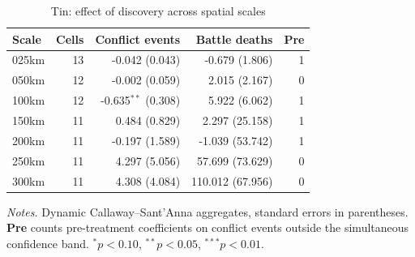 \begin{table}[H]
\centering
\footnotesize
\caption{Tin: effect of discovery across spatial scales}
\label{tab:tin_robustness}
\begin{tabular}{lrrrr}
\toprule
\textbf{Scale} & \textbf{Cells} & \textbf{Conflict events} & \textbf{Battle deaths} & \textbf{Pre} \\
\midrule
025km & 13 & -0.042 (0.043) & -0.679 (1.806) & 1 \\
050km & 12 & -0.002 (0.059) & 2.015 (2.167) & 0 \\
100km & 12 & -0.635$^{**}$ (0.308) & 5.922 (6.062) & 1 \\
150km & 11 & 0.484 (0.829) & 2.297 (25.158) & 1 \\
200km & 11 & -0.197 (1.589) & -1.039 (53.742) & 1 \\
250km & 11 & 4.297 (5.056) & 57.699 (73.629) & 0 \\
300km & 11 & 4.308 (4.084) & 110.012 (67.956) & 0 \\
\bottomrule
\end{tabular}
\begin{minipage}{0.9\textwidth}\vspace{4pt}\scriptsize \textit{Notes.} Dynamic Callaway--Sant'Anna aggregates, standard errors in parentheses. \textbf{Pre} counts pre-treatment coefficients on conflict events outside the simultaneous confidence band. $^{*}p<0.10$, $^{**}p<0.05$, $^{***}p<0.01$.\end{minipage}
\end{table}
